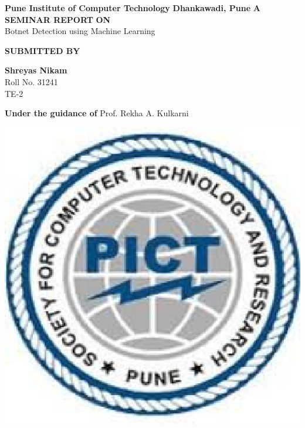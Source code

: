 \documentclass[a4paper, 12pt]{article}
\begin{document}
 
\begin{titlepage}
    \begin{center}
        \vspace*{1cm}
        
        \large
        \textbf{Pune Institute of Computer Technology}	
        \linebreak
		\textbf{Dhankawadi, Pune}
        \vspace{0.5cm}
        \linebreak
        \linebreak
        \textbf{A SEMINAR REPORT }
        \linebreak
        \textbf{ON }
        \linebreak
        \vspace{0.5cm}
        \large
        \\Botnet Detection using Machine Learning
        \linebreak
        \linebreak
		
		\textbf{SUBMITTED BY}
		\vspace{1cm}
		
        \textbf{ Shreyas Nikam }
        \\ Roll No. 31241
        \\ TE-2
        \linebreak
        \linebreak
		        
        \textbf{\large{Under the guidance of}}
		\linebreak
	    Prof. Rekha A. Kulkarni
		\linebreak
        
        \vspace{0.8cm}
        
        \includegraphics[scale=0.6]{pict}   
        

\end{center}
\end{titlepage}
\end{document}
